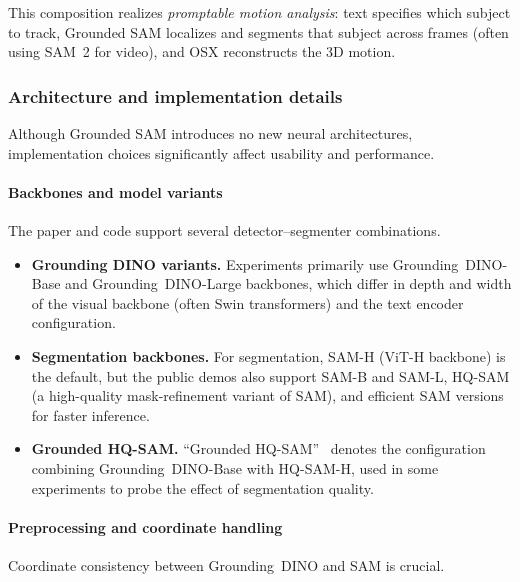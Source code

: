 \begin{enrichment}
\begin{enrichment}
		This composition realizes \emph{promptable motion analysis}: text specifies which subject to track, Grounded SAM localizes and segments that subject across frames (often using SAM~2 for video), and OSX reconstructs the 3D motion.
		
		\newpage
		
		\subsubsection{Architecture and implementation details}
		\label{subsubsec:chapter15_groundedsam_architecture}
		
		Although Grounded SAM introduces no new neural architectures, implementation choices significantly affect usability and performance.
		
		\paragraph{Backbones and model variants}
		The paper and code support several detector–segmenter combinations.
		
		\begin{itemize}
			\item \textbf{Grounding DINO variants.}
			Experiments primarily use Grounding~DINO-Base and Grounding~DINO-Large backbones, which differ in depth and width of the visual backbone (often Swin transformers) and the text encoder configuration.
			\item \textbf{Segmentation backbones.}
			For segmentation, SAM-H (ViT-H backbone) is the default, but the public demos also support SAM-B and SAM-L, HQ-SAM (a high-quality mask-refinement variant of SAM), and efficient SAM versions for faster inference.
			\item \textbf{Grounded HQ-SAM.}
			``Grounded HQ-SAM''~\cite{ke2023_hqsam} denotes the configuration combining Grounding~DINO-Base with HQ-SAM-H, used in some experiments to probe the effect of segmentation quality.
		\end{itemize}
		
		\paragraph{Preprocessing and coordinate handling}
		Coordinate consistency between Grounding~DINO and SAM is crucial.
		

\end{enrichment}
\end{enrichment}
